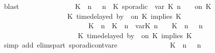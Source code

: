 \begin{isabellebody}
\ blast\isanewline
\ \ \ \ \ \ \ \ \ \ \isamarkupfalse%
\ \isamarkupfalse%
\ {\isacartoucheopen}{\isacharparenleft}\ \ {\isacharparenleft}{\isacharparenleft}K\ {\isasymUp}\ n{\isacharparenright}\ {\isacharhash}\ {\isasymGamma}{\isacharparenright}{\isacharcomma}\ n\ {\isasymturnstile}\ {\isacharparenleft}K\ sporadic{\isasymsharp}\ {\isasymlparr}\ {\isasymtau}\isactrlsub v\isactrlsub a\isactrlsub r\ {\isacharparenleft}K\ n{\isacharparenright}\ {\isasymoplus}\ {\isasymdelta}{\isasymtau}\ {\isasymrparr}\ on\ K\ {\isacharhash}\ {\isasymPsi}\isanewline
\ \ \ \ \ \ \ \ \ \ \ \ \ \ \ \ \ \ {\isasymtriangleright}\ {\isacharparenleft}{\isacharparenleft}K\ time{\isacharminus}delayed{\isasymsharp}\ by\ {\isasymdelta}{\isasymtau}\ on\ K\ implies\ K\ {\isacharhash}\ {\isasymPhi}{\isacharparenright}{\isacharparenright}\isanewline
\ \ \ \ \ \ \ \ \ \ \ \ \ \ \ \ \ \ \ \ \ \ \ \ {\isasymhookrightarrow}\ {\isacharparenleft}{\isacharparenleft}{\isacharparenleft}K\ {\isasymUp}\ n{\isacharparenright}\ {\isacharhash}\ {\isacharparenleft}K\ {\isasymDown}\ n\ {\isacharat}{\isasymsharp}\ {\isasymlparr}{\isasymtau}\isactrlsub v\isactrlsub a\isactrlsub r{\isacharparenleft}K\ n{\isacharparenright}\ {\isasymoplus}\ {\isasymdelta}{\isasymtau}{\isasymrparr}{\isacharparenright}\ {\isacharhash}\ {\isacharparenleft}K\ {\isasymUp}\ n{\isacharparenright}\ {\isacharhash}\ {\isasymGamma}{\isacharparenright}{\isacharcomma}\ n\isanewline
\ \ \ \ \ \ \ \ \ \ \ \ \ \ \ \ \ \ \ {\isasymturnstile}\ {\isasymPsi}\ {\isasymtriangleright}\ {\isacharparenleft}{\isacharparenleft}K\ time{\isacharminus}delayed{\isasymsharp}\ by\ {\isasymdelta}{\isasymtau}\ on\ K\ implies\ K\ {\isacharhash}\ {\isasymPhi}{\isacharparenright}{\isacharparenright}{\isacartoucheclose}\isanewline
\ \ \ \ \ \ \ \ \ \ \ \ \isamarkupfalse%
\ {\isacharparenleft}simp\ add{\isacharcolon}\ elims{\isacharunderscore}part\ sporadic{\isacharunderscore}on{\isacharunderscore}tvar{\isacharunderscore}e{}{\isacharparenright}\isanewline
\ \ \ \ \ \ \ \ \ \ \isamarkupfalse%
\ \isamarkupfalse%
\ {\isacartoucheopen}{\isacharparenleft}\ {\isacharparenleft}{\isacharparenleft}K\ {\isasymUp}\ n{\isacharparenright}\ {\isacharhash}\ {\isasymGamma}{\isacharparenright}{\isacharcomma}\ n\isanewline

\end{isabellebody}

